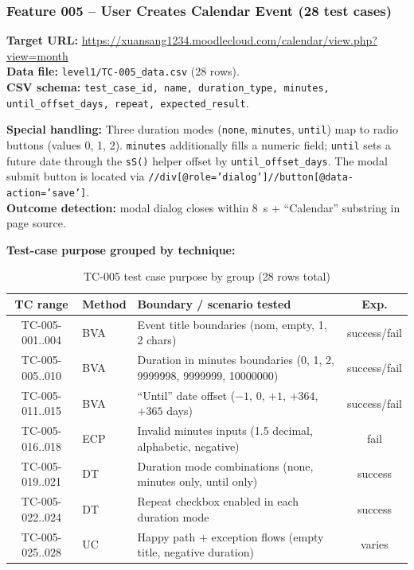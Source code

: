 \documentclass[twoside,final]{hcmut-report}
\begin{document}
\subsubsection{Feature 005 -- User Creates Calendar Event (28 test cases)}

\textbf{Target URL:} \url{https://xuansang1234.moodlecloud.com/calendar/view.php?view=month}\\
\textbf{Data file:} \texttt{level1/TC-005\_data.csv} (28 rows).\\
\textbf{CSV schema:} \texttt{test\_case\_id, name, duration\_type, minutes, until\_offset\_days, repeat, expected\_result}.

\textbf{Special handling:} Three duration modes (\texttt{none}, \texttt{minutes}, \texttt{until}) map to radio buttons (values 0, 1, 2). \texttt{minutes} additionally fills a numeric field; \texttt{until} sets a future date through the \texttt{sS()} helper offset by \texttt{until\_offset\_days}. The modal submit button is located via \texttt{//div[@role='dialog']//button[@data-action='save']}.\\
\textbf{Outcome detection:} modal dialog closes within 8~s + ``Calendar'' substring in page source.

\textbf{Test-case purpose grouped by technique:}
\begin{table}[H]
\centering
\renewcommand{\arraystretch}{1.2}
\begin{tabularx}{\textwidth}{|c|l|X|c|}
\hline
\textbf{TC range} & \textbf{Method} & \textbf{Boundary / scenario tested} & \textbf{Exp.} \\ \hline
TC-005-001..004 & BVA & Event title boundaries (nom, empty, 1, 2 chars) & success/fail \\ \hline
TC-005-005..010 & BVA & Duration in minutes boundaries (0, 1, 2, 9999998, 9999999, 10000000) & success/fail \\ \hline
TC-005-011..015 & BVA & ``Until'' date offset ($-1$, 0, $+1$, $+364$, $+365$ days) & success/fail \\ \hline
TC-005-016..018 & ECP & Invalid minutes inputs (1.5 decimal, alphabetic, negative) & fail \\ \hline
TC-005-019..021 & DT & Duration mode combinations (none, minutes only, until only) & success \\ \hline
TC-005-022..024 & DT & Repeat checkbox enabled in each duration mode & success \\ \hline
TC-005-025..028 & UC & Happy path + exception flows (empty title, negative duration) & varies \\ \hline
\end{tabularx}
\caption{TC-005 test case purpose by group (28 rows total)}
\end{table}
\end{document}

